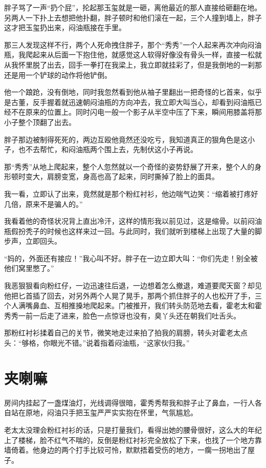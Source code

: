 胖子骂了一声“扔个屁”，抡起那玉玺就是一砸，离他最近的那人直接给砸翻在地。另两人一下扑上去想把他扑翻，胖子顿时和他们滚在一起，三个人撞到墙上，胖子这才把玉玺扔出来，闷油瓶接在手里。

那三人发现这样不行，两个人死命拽住胖子，那个“秀秀”一个人起来再次冲向闷油瓶，我爬起来从后面一下抱住他，就感觉这人软得好像没有骨头一样，直接一松就从我怀里脱了出去，回手一拳打在我梁上，我立即就挂彩了，但是我倒地的一刹那还是用一个铲球的动作将他铲倒。

他一个踉跄，没有倒地，同时我忽然看到他从袖子里翻出一把奇怪的匕首来，似乎是古董，反手握着就迅速朝闷油瓶的方向冲去，我立即大叫当心，却看到闷油瓶已经不在原来的位置上。同时闪电一般一个影子从半空中压了下来，瞬间用膝盖将那小子整个顶翻了出去。

胖子那边被制得死死的，两边互殴他竟然还没吃亏，我知道真正的狠角色是这小子，也不去帮忙，和闷油瓶两个围上去，先制伏这小子再说。

那“秀秀”从地上爬起来，整个人忽然就以一个奇怪的姿势舒展了开来，整个人的身形顿时变大，肩膀变宽，身高也高了起来，同时撕掉了脸上的面具。

我一看，立即认了出来，竟然就是那个粉红衬衫，他边喘气边笑：“缩着被打疼好几倍，原来不是骗人的。”

我看着他的奇怪状况背上直出冷汗，这样的情形我以前见过，这是缩骨。以前闷油瓶假扮秃子的时候也这样来过一回。与此同时，我们就听到楼梯上出现了大量的脚步声，立即回头。

“妈的，外面还有接应！”我心叫不好。胖子在一边立即大叫：“你们先走！别全被他们窝里憋了。”

我恶狠狠看向粉红仔，一边迅速往后退，一边想着怎么撤退，难道要爬天窗？却见他把匕首插了回去，对另外两个人晃了晃手，那两个抓住胖子的人也松开了手，三个人满嘴鼻血、互相推搡地爬起来。门被推开，我们转头防范地去看，霍老太和霍秀秀一前一后走了进来，脸色一点惊讶也没有，臭丫头还在朝我们吐舌头。

那粉红衬衫揉着自己的关节，微笑地走过来拍了拍我的肩膀，转头对霍老太点头：“够格，你眼光不错。”说着指着闷油瓶，“这家伙归我。”

\chapter{夹喇嘛}

房间内挂起了一盏煤油灯，光线调得很暗，霍秀秀帮我和胖子止了鼻血，一行人各自站在原地，闷油只手把玉玺严严实实抱在怀里，气氛尴尬。

老太太没理会粉红衬衫的话，只是打量我们，看得出她的腰骨很好，这么大的年纪上了楼梯，脸不红气不喘的，反倒是粉红衬衫完全放松了下来，也找了一个地方靠墙倚着。他身边的两个打手比较可怜，默默捂着受伤的地方，一瘸一拐地出了屋子。

